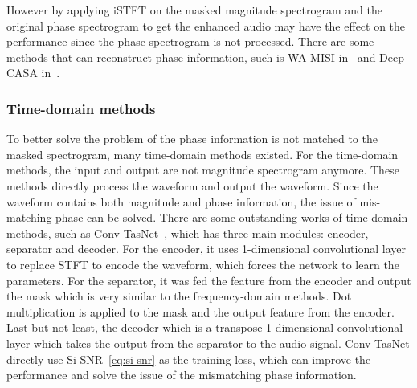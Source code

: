However by applying iSTFT on the masked magnitude spectrogram and the original phase spectrogram to get the enhanced audio may have the effect on the performance since the phase spectrogram is not processed.
There are some methods that can reconstruct phase information, such is WA-MISI in~\cite{WA-MISI} and Deep CASA in~\cite{Deep_CASA}.

\subsubsection{Time-domain methods}

To better solve the problem of the phase information is not matched to the masked spectrogram, many time-domain methods existed.
For the time-domain methods, the input and output are not magnitude spectrogram anymore.
These methods directly process the waveform and output the waveform.
Since the waveform contains both magnitude and phase information, the issue of mis-matching phase can be solved.
There are some outstanding works of time-domain methods, such as Conv-TasNet~\cite{conv_tasnet}, which has three main modules: encoder, separator and decoder.
For the encoder, it uses 1-dimensional convolutional layer to replace STFT to encode the waveform, which forces the network to learn the parameters.
For the separator, it was fed the feature from the encoder and output the mask which is very similar to the frequency-domain methods.
Dot multiplication is applied to the mask and the output feature from the encoder.
Last but not least, the decoder which is a transpose 1-dimensional convolutional layer which takes the output from the separator to the audio signal.
Conv-TasNet directly use Si-SNR~\ref{eq:si-snr} as the training loss, which can improve the performance and solve the issue of the mismatching phase information.
